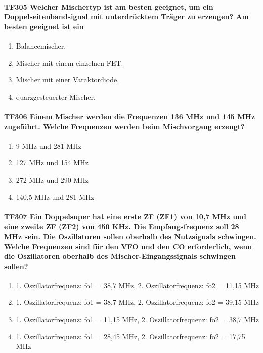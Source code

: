 \documentclass[8pt]{article}
\begin{document}
\paragraph*{TF305 Welcher Mischertyp ist am besten geeignet, um ein Doppelseitenbandsignal mit unterdrücktem Träger zu erzeugen? Am besten geeignet ist ein}
\begin{enumerate}[nolistsep,label=\Alph*]
\item Balancemischer.
\item Mischer mit einem einzelnen FET.
\item Mischer mit einer Varaktordiode.
\item quarzgesteuerter Mischer.
\end{enumerate}

\paragraph*{TF306 Einem Mischer werden die Frequenzen 136 MHz und 145 MHz zugeführt. Welche Frequenzen werden beim Mischvorgang erzeugt?}
\begin{enumerate}[nolistsep,label=\Alph*]
\item 9 MHz und 281 MHz
\item 127 MHz und 154 MHz
\item 272 MHz und 290 MHz
\item 140,5 MHz und 281 MHz
\end{enumerate}

\paragraph*{TF307 Ein Doppelsuper hat eine erste ZF (ZF1) von 10,7 MHz und eine zweite ZF (ZF2) von 450 KHz. Die Empfangsfrequenz soll 28 MHz sein. Die Oszillatoren sollen oberhalb des Nutzsignals schwingen. Welche Frequenzen sind für den VFO und den CO erforderlich, wenn die Oszillatoren oberhalb des Mischer-Eingangssignals schwingen sollen?}
\begin{enumerate}[nolistsep,label=\Alph*]
\item 1. Oszillatorfrequenz: fo1 = 38,7 MHz, 2. Oszillatorfrequenz: fo2 = 11,15 MHz
\item 1. Oszillatorfrequenz: fo1 = 38,7 MHz, 2. Oszillatorfrequenz: fo2 = 39,15 MHz
\item 1. Oszillatorfrequenz: fo1 = 11,15 MHz, 2. Oszillatorfrequenz: fo2 = 38,7 MHz
\item 1. Oszillatorfrequenz: fo1 = 28,45 MHz, 2. Oszillatorfrequenz: fo2 = 17,75 MHz
\end{enumerate}
\end{document}
